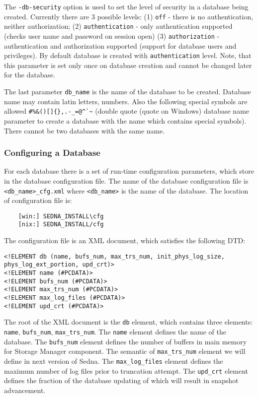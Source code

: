 \documentclass[a4paper,12pt]{article}
\begin{document}
The \verb!-db-security! option is used to set the level of security in a database being created. Currently there are 3 possible levels: (1) \verb!off! - there is no authentication, neither authorization; (2) \verb!authentication! - only authentication supported (checks user name and password on session open) (3) \verb!authorization! - authentication and authorization supported (support for database users and privileges). By default database is created with \verb!authentication! level. Note, that this parameter is set only once on database creation and cannot be changed later for the database.

The last parameter \verb!db_name! is the name of the database to be created.
Database name may contain latin letters, numbers. Also the following special
symbols are allowed \verb!#%&()[]{},.-_=@^`~! (double quote (quote on Windows) 
database name parameter to create a database with the name which contains 
special symbols). There cannot be two databases with the same name.

\subsubsection{Configuring a Database}
\label{ConfigDB}
For each database there is a set of run-time configuration parameters, which store in the database configuration file. The name of the database configuration file is \verb!<db_name>_cfg.xml! where \verb!<db_name>! is the name of the database. The location of configuration file is:
\begin{verbatim}
	[win:] SEDNA_INSTALL\cfg
	[nix:] SEDNA_INSTALL/cfg
\end{verbatim}

The configuration file is an XML document, which satisfies the following DTD:

\begin{verbatim}
<!ELEMENT db (name, bufs_num, max_trs_num, init_phys_log_size, phys_log_ext_portion, upd_crt)>
<!ELEMENT name (#PCDATA)>
<!ELEMENT bufs_num (#PCDATA)>
<!ELEMENT max_trs_num (#PCDATA)>
<!ELEMENT max_log_files (#PCDATA)>
<!ELEMENT upd_crt (#PCDATA)>
\end{verbatim}

The root of the XML document is the \verb!db! element, which contains three elements: \verb!name!, \verb!bufs_num!, \verb!max_trs_num!. The \verb!name! element defines the name of the database. The \verb!bufs_num! element defines the number of buffers in main memory for Storage Manager component. The semantic of \verb!max_trs_num! element we will define in next version of Sedna. The \verb!max_log_files! element defines the maximum number of log files prior to truncation attempt. The \verb!upd_crt! element defines the fraction of the database updating of which will result in snapshot advancement.
\end{document}
